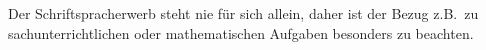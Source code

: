 Der Schriftspracherwerb steht nie für sich allein, daher ist der Bezug z.B.\ zu sachunterrichtlichen oder mathematischen Aufgaben besonders zu beachten.